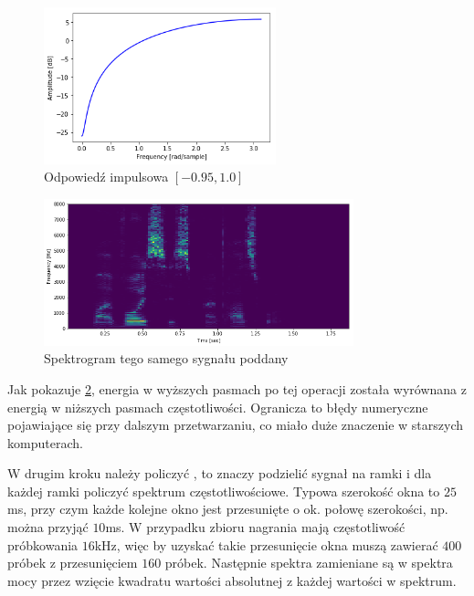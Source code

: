 \begin{figure}[H]
    \centering
    \includegraphics[width=0.6\textwidth]{images/2_1_c_preemphasis_response}
    \caption{Odpowiedź impulsowa  $[-0.95, 1.0]$}
    \label{fig:2_1_c_preemphasis_response}
\end{figure}

\begin{figure}[H]
    \centering
    \includegraphics[width=0.8\textwidth]{images/2_1_b_example_preemphasis}
    \caption{Spektrogram tego samego sygnału poddany }
    \label{fig:2_1_b_example_preemphasis}
\end{figure}

Jak pokazuje \ref{fig:2_1_b_example_preemphasis}, energia w wyższych pasmach po tej operacji
została wyrównana z energią w niższych pasmach częstotliwości. Ogranicza to błędy numeryczne
pojawiające się przy dalszym przetwarzaniu, co miało duże znaczenie w starszych komputerach.

W drugim kroku należy policzyć , to znaczy podzielić
sygnał na ramki i dla każdej ramki policzyć spektrum częstotliwościowe. Typowa szerokość
okna to $25$ms, przy czym każde kolejne okno jest przesunięte o ok. połowę szerokości,
np. można przyjąć $10$ms. W przypadku zbioru  nagrania mają częstotliwość próbkowania $16$kHz,
więc by uzyskać takie przesunięcie okna muszą zawierać $400$ próbek z przesunięciem $160$ próbek.
Następnie spektra zamieniane są w spektra mocy przez wzięcie kwadratu wartości absolutnej
z każdej wartości w spektrum.

